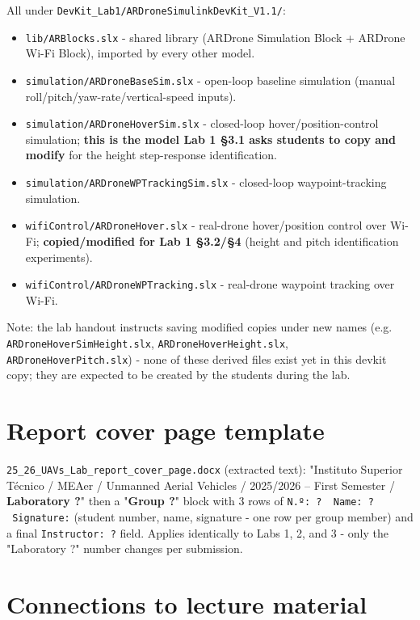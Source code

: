 \documentclass[11pt]{article}
\begin{document}
All under \texttt{DevKit\_\allowbreak{}Lab1/\allowbreak{}ARDroneSimulinkDevKit\_\allowbreak{}V1.1/}:
\begin{itemize}
\item \texttt{lib/ARBlocks.slx} - shared library (ARDrone Simulation Block + ARDrone Wi-Fi Block), imported by every other model.
\item \texttt{simulation/\allowbreak{}ARDroneBaseSim.slx} - open-loop baseline simulation (manual roll/pitch/yaw-rate/vertical-speed inputs).
\item \texttt{simulation/\allowbreak{}ARDroneHoverSim.slx} - closed-loop hover/position-control simulation; \textbf{this is the model Lab 1 §3.1 asks students to copy and modify} for the height step-response identification.
\item \texttt{simulation/\allowbreak{}ARDroneWPTrackingSim.slx} - closed-loop waypoint-tracking simulation.
\item \texttt{wifiControl/\allowbreak{}ARDroneHover.slx} - real-drone hover/position control over Wi-Fi; \textbf{copied/modified for Lab 1 §3.2/§4} (height and pitch identification experiments).
\item \texttt{wifiControl/\allowbreak{}ARDroneWPTracking.slx} - real-drone waypoint tracking over Wi-Fi.
\end{itemize}

Note: the lab handout instructs saving modified copies under new names (e.g. \texttt{ARDroneHoverSimHeight.slx}, \texttt{ARDroneHoverHeight.slx}, \texttt{ARDroneHoverPitch.slx}) - none of these derived files exist yet in this devkit copy; they are expected to be created by the students during the lab.

\section{Report cover page template}

\texttt{25\_\allowbreak{}26\_\allowbreak{}UAVs\_\allowbreak{}Lab\_\allowbreak{}report\_\allowbreak{}cover\_\allowbreak{}page.docx} (extracted text): "Instituto Superior Técnico / MEAer / Unmanned Aerial Vehicles / 2025/2026 -- First Semester / \textbf{Laboratory ?}" then a "\textbf{Group ?}" block with 3 rows of \texttt{N.º: ? \ Name: ? \ Signature:} (student number, name, signature - one row per group member) and a final \texttt{Instructor: ?} field. Applies identically to Labs 1, 2, and 3 - only the "Laboratory ?" number changes per submission.

\section{Connections to lecture material}
\end{document}
